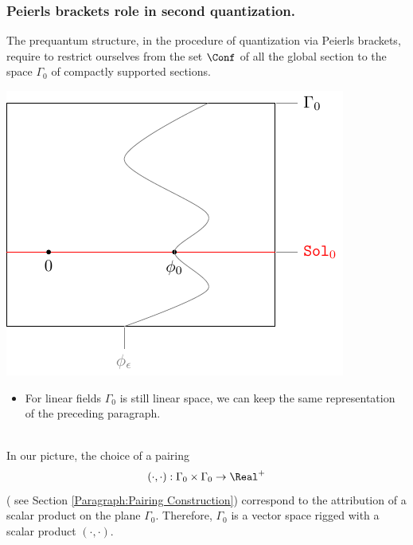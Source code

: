 \documentclass[Main]{subfiles}
\begin{document}
		
		
		\subsubsection{Peierls brackets role in second quantization.}
		The prequantum structure, in the procedure of quantization via Peierls brackets, require to restrict ourselves from the set $\Conf$ of all the global section to the space $\Gamma_0$ of compactly supported sections.

		\vspace{1mm}		
		\begin{minipage}{0.5\textwidth}
			\includegraphics[width=\textwidth]{Pictures/compsupp_GeometricPicture0}
		\end{minipage}
		\begin{minipage}{0.5\textwidth}
			\begin{itemize}
				\item  For linear fields $\Gamma_0$ is still linear space, we can keep the same representation of the preceding paragraph.
			\end{itemize}
		\end{minipage}
		\vspace{1mm}\\					

	In our picture, the  choice of a pairing 
	\begin{displaymath}
		( \cdot , \cdot ) : \Gamma_0 \times \Gamma_0 \rightarrow \Real^+
	\end{displaymath}
	 ( see Section \ref{Paragraph:Pairing Construction}) correspond to the attribution of a scalar product on the plane $\Gamma_0$.
	Therefore, $\Gamma_0$ is a vector space rigged with a scalar product $(\cdot , \cdot)$.\\
\end{document}
